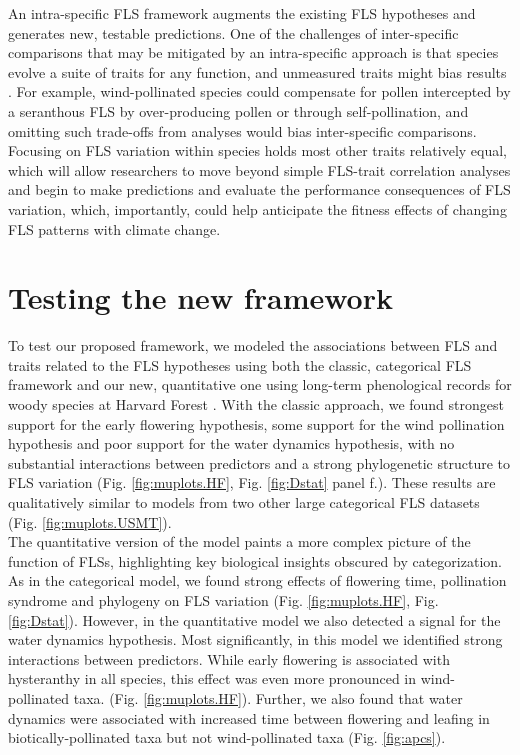 \documentclass{article}
\begin{document}
\noindent An intra-specific FLS framework augments the existing FLS hypotheses and generates new, testable predictions. One of the challenges of inter-specific comparisons that may be mitigated by an intra-specific approach is that species evolve a suite of traits for any function, and unmeasured traits might bias results \citep{Davies2019}. For example, wind-pollinated species could compensate for pollen intercepted by a seranthous FLS by over-producing pollen or through self-pollination, and omitting such trade-offs from analyses would bias inter-specific comparisons. Focusing on FLS variation within species holds most other traits relatively equal, which will allow researchers to move beyond simple FLS-trait correlation analyses and begin to make predictions and evaluate the performance consequences of FLS variation, which, importantly, could help anticipate the fitness effects of changing FLS patterns with climate change. 


 
\section*{Testing the new framework}

To test our proposed framework, we modeled the associations between FLS and traits related to the FLS hypotheses using both the classic, categorical FLS framework and our new, quantitative one using long-term phenological records for woody species at Harvard Forest \citep{OKeefe2015}. With the classic approach, we found strongest support for the early flowering hypothesis, some support for the wind pollination hypothesis and poor support for the water dynamics hypothesis, with no substantial interactions between predictors and a strong phylogenetic structure to FLS variation (Fig. \ref{fig:muplots.HF}, Fig.  \ref{fig:Dstat} panel f.). These results are qualitatively similar to models from two other large categorical FLS datasets (Fig. \ref{fig:muplots.USMT}). \\

\noindent The quantitative version of the model paints a more complex picture of the function of FLSs, highlighting key biological insights obscured by categorization. As in the categorical model, we found strong effects of flowering time, pollination syndrome and phylogeny on FLS variation (Fig. \ref{fig:muplots.HF}, Fig. \ref{fig:Dstat}). However, in the quantitative model we also detected a signal for the water dynamics hypothesis. %
Most significantly, in this model we identified strong interactions between predictors. While early flowering is associated with hysteranthy in all species, this effect was even more pronounced in wind-pollinated taxa. (Fig. \ref{fig:muplots.HF}). Further, we also found that water dynamics were associated with increased time between flowering and leafing in biotically-pollinated taxa but not wind-pollinated taxa (Fig. \ref{fig:apcs}). \\ 
\end{document}
